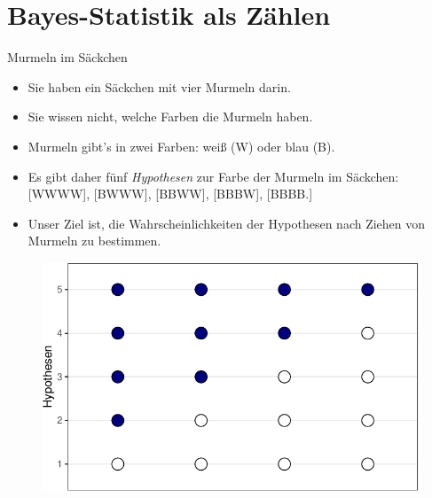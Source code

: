 \documentclass[
  ngerman,
  ignorenonframetext,
]{beamer}
\begin{document}
\hypertarget{bayes-statistik-als-zuxe4hlen}{%
\section{Bayes-Statistik als
Zählen}\label{bayes-statistik-als-zuxe4hlen}}

\begin{frame}{Murmeln im Säckchen}
\protect\hypertarget{murmeln-im-suxe4ckchen}{}
\begin{itemize}
\item
  Sie haben ein Säckchen mit vier Murmeln darin.
\item
  Sie wissen nicht, welche Farben die Murmeln haben.
\item
  Murmeln gibt's in zwei Farben: weiß (W) oder blau (B).
\item
  Es gibt daher fünf \emph{Hypothesen} zur Farbe der Murmeln im
  Säckchen: {[}WWWW{]}, {[}BWWW{]}, {[}BBWW{]}, {[}BBBW{]}, {[}BBBB.{]}
\item
  Unser Ziel ist, die Wahrscheinlichkeiten der Hypothesen nach Ziehen
  von Murmeln zu bestimmen.
\end{itemize}

\begin{figure}[H]
\includegraphics[width=0.5\linewidth]{unnamed-chunk-6-1} \end{figure}
\end{frame}
\end{document}

